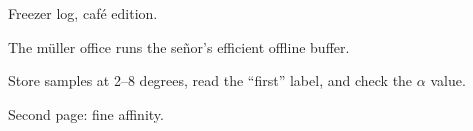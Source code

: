 \documentclass{article}
\begin{document}
Freezer log, café edition.

The müller office runs the señor's efficient offline buffer.

Store samples at 2–8 degrees, read the “first” label, and check the $\alpha$ value.

\newpage
\null
\newpage
Second page: fine affinity.
\end{document}
